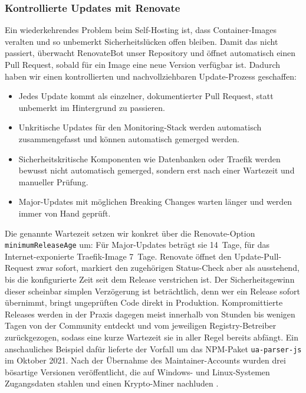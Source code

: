 \subsubsection{Kontrollierte Updates mit Renovate}
\label{sec:renovate}
Ein wiederkehrendes Problem beim Self-Hosting ist, dass Container-Images
veralten und so unbemerkt Sicherheitslücken offen bleiben. Damit das nicht
passiert, überwacht RenovateBot unser Repository und öffnet automatisch einen
Pull Request, sobald für ein Image eine neue Version verfügbar ist. Dadurch
haben wir einen kontrollierten und nachvollziehbaren Update-Prozess geschaffen:

\begin{itemize}
  \item Jedes Update kommt als einzelner, dokumentierter Pull Request, statt
    unbemerkt im Hintergrund zu passieren.
  \item Unkritische Updates für den Monitoring-Stack werden automatisch
    zusammengefasst und können automatisch gemerged werden.
  \item Sicherheitskritische Komponenten wie Datenbanken oder Traefik werden
    bewusst nicht automatisch gemerged, sondern erst nach einer Wartezeit und
    manueller Prüfung.
  \item Major-Updates mit möglichen Breaking Changes warten länger und werden
    immer von Hand geprüft.
\end{itemize}

Die genannte Wartezeit setzen wir konkret über die Renovate-Option
\texttt{minimumReleaseAge} um: Für Major-Updates beträgt sie 14~Tage, für das
Internet-exponierte Traefik-Image 7~Tage. Renovate öffnet den Update-Pull-Request
zwar sofort, markiert den zugehörigen Status-Check aber als ausstehend, bis die
konfigurierte Zeit seit dem Release verstrichen ist.
Der Sicherheitsgewinn dieser scheinbar simplen Verzögerung ist beträchtlich, denn wer ein Release sofort übernimmt,
bringt ungeprüften Code direkt in Produktion. Kompromittierte Releases werden in der Praxis dagegen meist
innerhalb von Stunden bis wenigen Tagen von der Community entdeckt und vom
jeweiligen Registry-Betreiber zurückgezogen, sodass eine kurze Wartezeit sie
in aller Regel bereits abfängt. Ein anschauliches Beispiel dafür lieferte der
Vorfall um das NPM-Paket \texttt{ua-parser-js} im Oktober 2021. Nach der
Übernahme des Maintainer-Accounts wurden drei bösartige Versionen
veröffentlicht, die auf Windows- und Linux-Systemen Zugangsdaten stahlen und
einen Krypto-Miner nachluden \cite{cisa_ua_parser_js_2021}.

